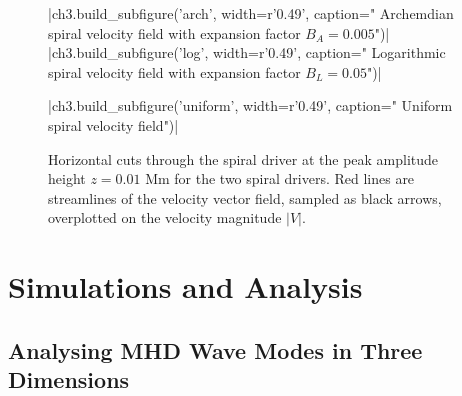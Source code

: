 \begin{figure}[H]
	\py[chapter3]|ch3.build_subfigure('arch', width=r'0.49\columnwidth', caption="
	Archemdian spiral velocity field with expansion factor $B_A=0.005$")|
	\py[chapter3]|ch3.build_subfigure('log', width=r'0.49\columnwidth', caption="
	Logarithmic spiral velocity field with expansion factor $B_L=0.05$")|

	\centering
	\py[chapter3]|ch3.build_subfigure('uniform', width=r'0.49\columnwidth', caption="
	Uniform spiral velocity field")|
	
	\caption{Horizontal cuts through the spiral driver at the peak amplitude height $z = 0.01$ Mm for the two spiral drivers. Red lines are streamlines of the velocity vector field, sampled as black arrows, overplotted on the velocity magnitude $|V|$.}
	\label{fig:spiral_driver_cut}
\end{figure}

\section{Simulations and Analysis}\label{sec:sim_and_analysis}


\subsection{Analysing MHD Wave Modes in Three Dimensions}\label{sec:3d_analysis}

